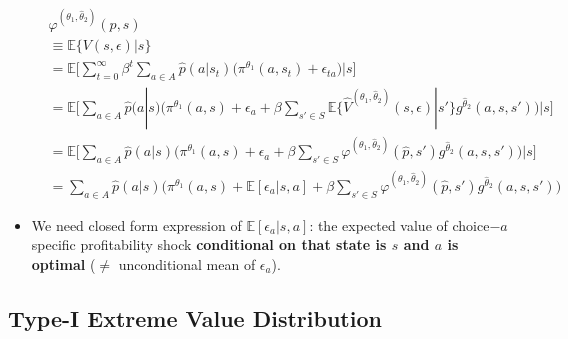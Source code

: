 \documentclass[]{book}
\begin{document}
\begin{itemize}
  \begin{equation}
  \begin{split}
  &\varphi^{(\theta_1, \hat{\theta}_2)}(p, s)\\
  &\equiv \mathbb{E}\{V(s, \epsilon)|s\}\\
  &= \mathbb{E}\Bigg[ \sum_{t = 0}^\infty \beta^t \sum_{a \in A}\hat{p}(a|s_t)\Bigg(\pi^{\theta_1}(a, s_t) + \epsilon_{ta}\Bigg)\Bigg|s\Bigg]\\
  &=\mathbb{E}\Bigg[\sum_{a \in A}\hat{p}(a|s)\Bigg(\pi^{\theta_1}(a, s) + \epsilon_{a} + \beta \sum_{s' \in S} \mathbb{E}\{\hat{V}^{(\theta_1, \hat{\theta}_2)}(s, \epsilon)|s'\} g^{\hat{\theta}_2}(a, s, s')  \Bigg)\Bigg|s\Bigg]\\
  &=\mathbb{E}\Bigg[\sum_{a \in A}\hat{p}(a|s)\Bigg(\pi^{\theta_1}(a, s) + \epsilon_{a} + \beta \sum_{s' \in S} \varphi^{(\theta_1, \hat{\theta}_2)}(\hat{p}, s') g^{\hat{\theta}_2}(a, s, s')  \Bigg)\Bigg|s\Bigg]\\
  &=\sum_{a \in A}\hat{p}(a|s)\Bigg(\pi^{\theta_1}(a, s) + \mathbb{E}[\epsilon_{a}|s, a] + \beta \sum_{s' \in S} \varphi^{(\theta_1, \hat{\theta}_2)}(\hat{p}, s') g^{\hat{\theta}_2}(a, s, s')  \Bigg)
  \end{split}
  \end{equation}
\item
  We need closed form expression of \(\mathbb{E}[\epsilon_{a}|s, a]\):
  the expected value of choice\(-a\) specific profitability shock
  \textbf{conditional on that state is \(s\) and \(a\) is optimal}
  (\(\neq\) unconditional mean of \(\epsilon_a\)).
\end{itemize}

\subsection{Type-I Extreme Value
Distribution}\label{type-i-extreme-value-distribution-1}
\end{document}
